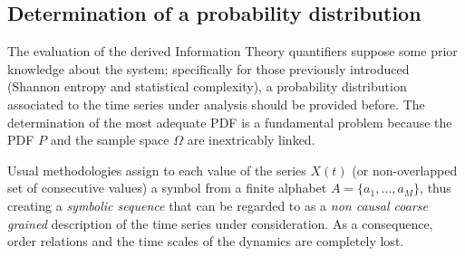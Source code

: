 \subsection{Determination of a probability distribution}

The evaluation of the derived Information Theory quantifiers suppose some prior knowledge about the system; specifically for those previously introduced (Shannon entropy and statistical complexity), a probability distribution associated to the time series under analysis should be provided before.
The determination of the most adequate PDF is a fundamental problem because the PDF $P$ and the sample space $\Omega$ are inextricably linked. 

Usual methodologies assign to each value of the series $X(t)$ (or non-overlapped set of consecutive values) a symbol from a finite alphabet $A=\{a_1,\dots,a_M\}$, thus creating a {\it symbolic sequence} that can be regarded to as a {\it non causal coarse grained\/} description of the time series under consideration. 
As a consequence, order relations and the time scales of the dynamics are completely lost. 

